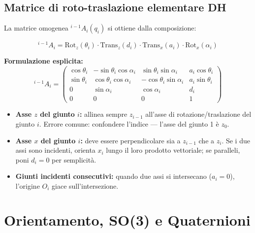\documentclass[11pt, a4paper]{article}
\newcommand{\Rot}{\mathrm{Rot}}
\newcommand{\Trans}{\mathrm{Trans}}
\begin{document}
\subsection{Matrice di roto-traslazione elementare DH}

La matrice omogenea ${}^{i-1}A_i(q_i)$ si ottiene dalla composizione:
\begin{formulabox}
\[
{}^{i-1}A_i = \Rot_z(\theta_i)\cdot\Trans_z(d_i)\cdot\Trans_x(a_i)\cdot\Rot_x(\alpha_i)
\]

\medskip
\textbf{Formulazione esplicita:}
\[
{}^{i-1}A_i =
\begin{pmatrix}
\cos\theta_i & -\sin\theta_i\cos\alpha_i &  \sin\theta_i\sin\alpha_i & a_i\cos\theta_i \\
\sin\theta_i &  \cos\theta_i\cos\alpha_i & -\cos\theta_i\sin\alpha_i & a_i\sin\theta_i \\
0            &  \sin\alpha_i             &  \cos\alpha_i             & d_i             \\
0            &  0                        &  0                        & 1
\end{pmatrix}
\]
\end{formulabox}

\begin{examtip}
\begin{itemize}[leftmargin=1.2em, itemsep=3pt]
  \item \textbf{Asse $z$ del giunto $i$:} allinea sempre $z_{i-1}$ all'asse di rotazione/traslazione
        del giunto $i$. Errore comune: confondere l'indice --- l'asse del giunto 1 è $z_0$.
  \item \textbf{Asse $x$ del giunto $i$:} deve essere perpendicolare sia a $z_{i-1}$ che a $z_i$.
        Se i due assi sono incidenti, orienta $x_i$ lungo il loro prodotto vettoriale;
        se paralleli, poni $d_i = 0$ per semplicità.
  \item \textbf{Giunti incidenti consecutivi:} quando due assi si intersecano ($a_i = 0$),
        l'origine $O_i$ giace sull'intersezione.
\end{itemize}
\end{examtip}

\section{Orientamento, SO(3) e Quaternioni}
\end{document}
